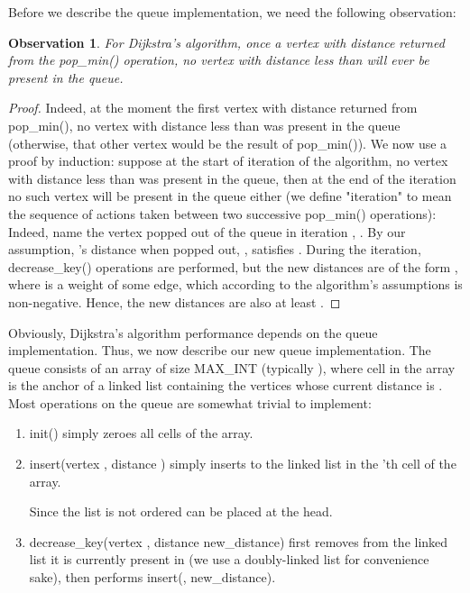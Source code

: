 \documentclass[conference,10pt,twocolumn]{IEEEtran}
\newtheorem{obsrv}{Observation}
\begin{document}
Before we describe the queue implementation, we need the following observation:

\begin{obsrv}
\label{non-decreasing}
For Dijkstra's algorithm, once a vertex with distance  returned from the pop\_min() operation, no vertex with distance less than  will ever be present in the queue.
\end{obsrv}

\begin{proof}
Indeed, at the moment the first vertex with distance  returned from pop\_min(), no vertex with distance less than  was present in the queue (otherwise, that other vertex would be the result of pop\_min()).
We now use a proof by induction: suppose at the start of iteration  of the algorithm, no vertex with distance less than  was present in the queue, then at the end of the iteration no such vertex will be present in the queue either (we define "iteration" to mean the sequence of actions taken between two successive pop\_min() operations):
Indeed, name the vertex popped out of the queue in iteration , . By our assumption, 's distance when popped out, , satisfies . During the iteration, decrease\_key() operations are performed, but the new distances are of the form , where  is a weight of some edge, which according to the algorithm's assumptions is non-negative. Hence, the new distances are also at least .
\end{proof}

Obviously, Dijkstra's algorithm performance depends on the queue implementation.  Thus, we now describe our new queue implementation. The queue consists of an array of size MAX\_INT (typically ), where cell  in the array is the anchor of a linked list containing the vertices whose current distance is . Most operations on the queue are somewhat trivial to implement:

\begin{enumerate}

\item init() simply zeroes all cells of the array.

\item insert(vertex , distance ) simply inserts  to the linked list in the 'th cell of the array.  

Since the list is not ordered  can be placed at the head.

\item decrease\_key(vertex , distance new\_distance) first removes  from the linked list it is currently present in (we use a doubly-linked list for convenience sake), then performs insert(, new\_distance).

\end{enumerate}
\end{document}
